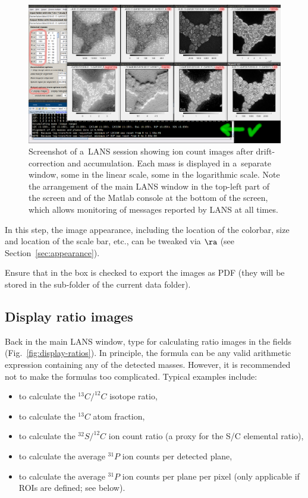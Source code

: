 \begin{figure}[!ht]
\centering
\includegraphics[width=\textwidth]{figs3/LANS-display-masses}
\caption{\label{fig:display-masses}%
Screenshot of a~LANS session showing ion count images after drift-correction and accumulation. Each mass is displayed in a~separate window, some in the linear scale, some in the logarithmic scale. Note the arrangement of the main LANS window in the top-left part of the screen and of the Matlab console at the bottom of the screen, which allows monitoring of messages reported by LANS at all times.}
\end{figure}

\nb
\bul In this step, the image appearance, including the location of the colorbar, size and location of the scale bar, etc., can be tweaked via  $\ra$  (see Section~\ref{sec:appearance}). 

\bul Ensure that  in the  box is checked to export the images as PDF (they will be stored in the  sub-folder of the current data folder).


\subsection{Display ratio images}
\setcounter{step}{0}

\s Back in the main LANS window, type  for calculating ratio images in the   fields (Fig.~\ref{fig:display-ratios}). In principle, the formula can be any valid arithmetic expression containing any of the detected masses. However, it is recommended not to make the formulas too complicated. Typical examples include:

\begin{itemize}
\item {} to calculate the $^{13}C/^{12}C$ isotope ratio,
\item {} to calculate the $^{13}C$ atom fraction,
\item {} to calculate the $^{32}S/^{12}C$ ion count ratio (a proxy for the S/C elemental ratio), 
\item {} to calculate the average $^{31}P$ ion counts per detected plane, 
\item {} to calculate the average $^{31}P$ ion counts per plane per pixel (only applicable if ROIs are defined; see below).
\end{itemize}

